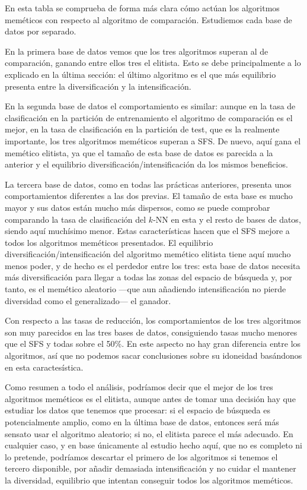 \documentclass[a4paper, 11pt, titlepage]{article}
\begin{document}
    En esta tabla se comprueba de forma más clara cómo actúan los algoritmos meméticos con respecto al algoritmo de comparación. Estudiemos cada base de datos por separado.

    En la primera base de datos vemos que los tres algoritmos superan al de comparación, ganando entre ellos tres el elitista. Esto se debe principalmente a lo explicado en la última sección: el último algoritmo es el que más equilibrio presenta entre la diversificación y la intensificación.

    En la segunda base de datos el comportamiento es similar: aunque en la tasa de clasificación en la partición de entrenamiento el algoritmo de comparación es el mejor, en la tasa de clasificación en la partición de test, que es la realmente importante, los tres algoritmos meméticos superan a SFS. De nuevo, aquí gana el memético elitista, ya que el tamaño de esta base de datos es parecida a la anterior y el equilibrio diversificación/intensificación da los mismos beneficios.

    La tercera base de datos, como en todas las prácticas anteriores, presenta unos comportamientos diferentes a las dos previas. El tamaño de esta base es mucho mayor y sus datos están mucho más dispersos, como se puede comprobar comparando la tasa de clasificación del $k$-NN en esta y el resto de bases de datos, siendo aquí muchísimo menor. Estas características hacen que el SFS mejore a todos los algoritmos meméticos presentados. El equilibrio diversificación/intensificación del algoritmo memético elitista tiene aquí mucho menos poder, y de hecho es el perdedor entre los tres: esta base de datos necesita más diversificación para llegar a todas las zonas del espacio de búsqueda y, por tanto, es el memético aleatorio ---que aun añadiendo intensificación no pierde diversidad como el generalizado--- el ganador.

    Con respecto a las tasas de reducción, los comportamientos de los tres algoritmos son muy parecidos en las tres bases de datos, consiguiendo tasas mucho menores que el SFS y todas sobre el 50\%. En este aspecto no hay gran diferencia entre los algoritmos, así que no podemos sacar conclusiones sobre su idoneidad basándonos en esta caractesística.

    Como resumen a todo el análisis, podríamos decir que el mejor de los tres algoritmos meméticos es el elitista, aunque antes de tomar una decisión hay que estudiar los datos que tenemos que procesar: si el espacio de búsqueda es potencialmente amplio, como en la última base de datos, entonces será más sensato usar el algoritmo aleatorio; si no, el elitista parece el más adecuado. En cualquier caso, y en base únicamente al estudio hecho aquí, que no es completo ni lo pretende, podríamos descartar el primero de los algoritmos si tenemos el tercero disponible, por añadir demasiada intensificación y no cuidar el mantener la diversidad, equilibrio que intentan conseguir todos los algoritmos meméticos.
\end{document}

